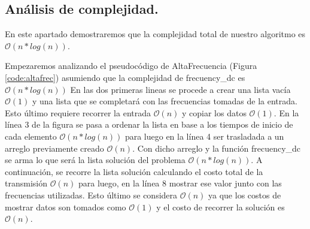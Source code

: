 \vspace*{0.6cm}






\subsection{Análisis de complejidad.}

\vspace*{0.3cm}

En este apartado demostraremos que la complejidad total de nuestro algoritmo es $\mathcal{O}(n*log(n))$.

Empezaremos analizando el pseudocódigo de AltaFrecuencia (Figura \ref{code:altafrec}) asumiendo que la complejidad de frecuency_dc es $\mathcal{O}(n*log(n))$
En las dos primeras lineas se procede a crear una lista vacía $\mathcal{O}(1)$ y una lista que se completará con las frecuencias tomadas de la entrada. Esto último requiere recorrer la entrada $\mathcal{O}(n)$ y copiar los datos $\mathcal{O}(1)$.
En la línea 3 de la figura se pasa a ordenar la lista en base a los tiempos de inicio de cada elemento $\mathcal{O}(n*log(n))$ para luego en la línea 4 ser trasladada a un arreglo previamente creado $\mathcal{O}(n)$. Con dicho arreglo y la función frecuency_dc se arma lo que será la lista solución del problema $\mathcal{O}(n*log(n))$. A continuación, se recorre la lista solución calculando el costo total de la transmisión $\mathcal{O}(n)$ para luego, en la línea 8 mostrar ese valor junto con las frecuencias utilizadas. Esto último se considera $\mathcal{O}(n)$ ya que los costos de mostrar datos son tomados como $\mathcal{O}(1)$ y el costo de recorrer la solución es $\mathcal{O}(n)$.

